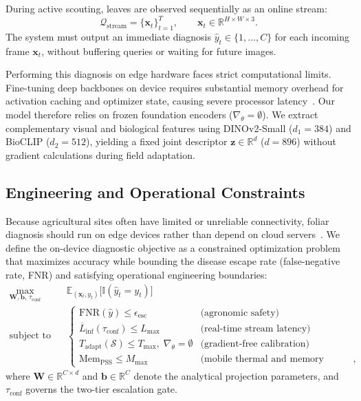 \documentclass[preprint,12pt]{elsarticle}
\begin{document}
During active scouting, leaves are observed sequentially as an online stream:
\begin{equation}
    \mathcal{Q}_{\text{stream}} = \{\mathbf{x}_t\}_{t=1}^{T}, \qquad \mathbf{x}_t \in \mathbb{R}^{H \times W \times 3}.
\end{equation}
The system must output an immediate diagnosis $\hat{y}_t \in \{1, \dots, C\}$ for each incoming frame $\mathbf{x}_t$, without buffering queries or waiting for future images.

Performing this diagnosis on edge hardware faces strict computational limits. Fine-tuning deep backbones on device requires substantial memory overhead for activation caching and optimizer state, causing severe processor latency~\cite{lin2022device,radocaj2025evolution}. Our model therefore relies on frozen foundation encoders ($\nabla_\theta = \emptyset$). We extract complementary visual and biological features using DINOv2-Small ($d_1 = 384$) and BioCLIP ($d_2 = 512$), yielding a fixed joint descriptor $\mathbf{z} \in \mathbb{R}^d$ ($d = 896$) without gradient calculations during field adaptation.

\subsection{Engineering and Operational Constraints}
\label{sec:engineering_constraints}
Because agricultural sites often have limited or unreliable connectivity, foliar diagnosis should run on edge devices rather than depend on cloud servers~\cite{radocaj2025evolution,sharif2026real}. We define the on-device diagnostic objective as a constrained optimization problem that maximizes accuracy while bounding the disease escape rate (false-negative rate, FNR) and satisfying operational engineering boundaries:
\begin{equation}
\begin{aligned}
    \max_{\mathbf{W}, \mathbf{b}, \, \tau_{\text{conf}}} \quad & \mathbb{E}_{(\mathbf{x}_t, y_t)}\big[\mathbb{I}(\hat{y}_t = y_t)\big] \\
    \text{subject to} \quad & \begin{cases}
        \text{FNR}(\hat{y}) \le \epsilon_{\text{esc}} & \text{(agronomic safety)} \\
        \overline{L}_{\text{inf}}(\tau_{\text{conf}}) \le L_{\max} & \text{(real-time stream latency)} \\
        T_{\text{adapt}}(\mathcal{S}) \le T_{\max}, \; \nabla_\theta = \emptyset & \text{(gradient-free calibration)} \\
        \text{Mem}_{\text{PSS}} \le M_{\max} & \text{(mobile thermal and memory budget)},
    \end{cases}
\end{aligned}
\label{eq:constrained_objective}
\end{equation}
where $\mathbf{W} \in \mathbb{R}^{C \times d}$ and $\mathbf{b} \in \mathbb{R}^C$ denote the analytical projection parameters, and $\tau_{\text{conf}}$ governs the two-tier escalation gate.
\end{document}
